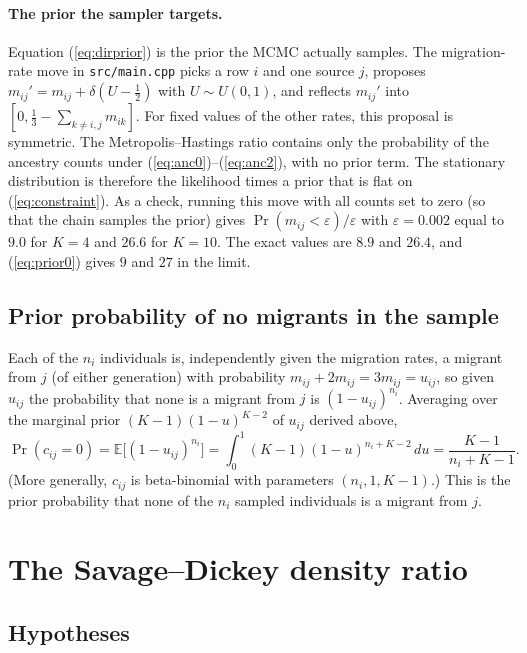 \documentclass[11pt,a4paper]{article}
\newcommand{\E}{\mathbb{E}}
\newcommand{\1}{\mathbf{1}}
\begin{document}
\paragraph{The prior the sampler targets.}
Equation (\ref{eq:dirprior}) is the prior the MCMC actually samples. The
migration-rate move in \texttt{src/main.cpp} picks a row $i$ and one source
$j$, proposes $m_{ij}' = m_{ij} + \delta(U-\frac12)$ with $U\sim
U(0,1)$, and reflects $m_{ij}'$ into $[0, \frac13 - \sum_{k\neq i,j} m_{ik}]$.
For fixed values of the other rates, this proposal is symmetric. The
Metropolis--Hastings ratio contains only the probability of the ancestry counts
under (\ref{eq:anc0})--(\ref{eq:anc2}), with no prior term. The stationary
distribution is therefore the likelihood times a prior that is flat on
(\ref{eq:constraint}). As a check, running this move with all counts set to
zero (so that the chain samples the prior) gives
$\Pr(m_{ij}<\varepsilon)/\varepsilon$ with $\varepsilon=0.002$ equal to $9.0$
for $K=4$ and $26.6$ for $K=10$. The exact values are $8.9$ and $26.4$, and
(\ref{eq:prior0}) gives $9$ and $27$ in the limit.

\subsection{Prior probability of no migrants in the sample}

Each of the $n_i$ individuals is, independently given the migration rates, a
migrant from $j$ (of either generation) with probability
$m_{ij}+2m_{ij}=3m_{ij}=u_{ij}$, so given $u_{ij}$ the probability that none is
a migrant from $j$ is $(1-u_{ij})^{n_i}$. Averaging over the marginal prior
$(K-1)(1-u)^{K-2}$ of $u_{ij}$ derived above,
\begin{equation}
\Pr(c_{ij}=0) = \E\big[(1-u_{ij})^{n_i}\big]
= \int_0^1 (K-1)(1-u)^{n_i+K-2}\,du = \frac{K-1}{n_i+K-1}.
\label{eq:priorc0}
\end{equation}
(More generally, $c_{ij}$ is beta-binomial with parameters $(n_i, 1, K-1)$.)
This is the prior probability that none of the $n_i$ sampled individuals is a
migrant from $j$.

\section{The Savage--Dickey density ratio}
\label{sec:sd}

\subsection{Hypotheses}
\end{document}
